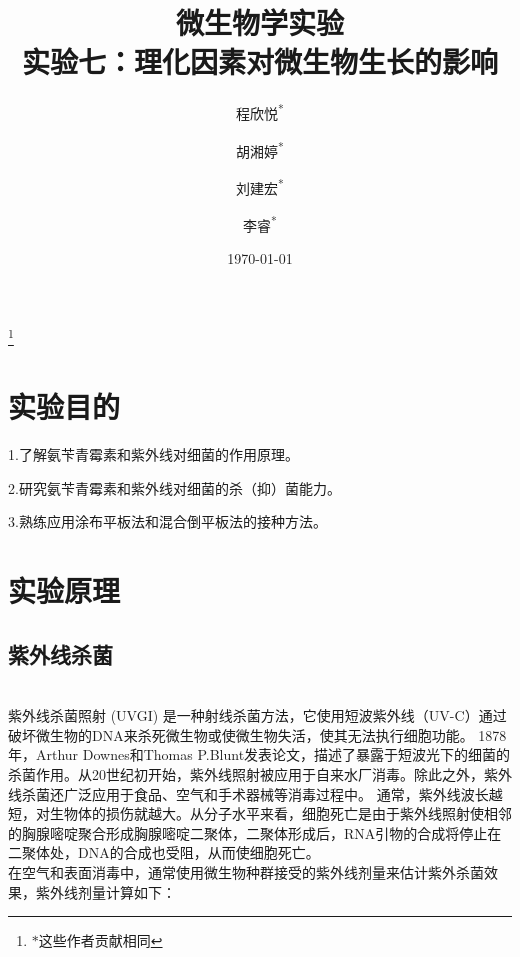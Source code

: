 \documentclass[UTF8]{ctexart}
\begin{document}
    \title{微生物学实验\\实验七：理化因素对微生物生长的影响}
    \author{程欣悦\textsuperscript{*}        \and
            胡湘婷\textsuperscript{*}        \and
            刘建宏\textsuperscript{*}        \and
            李睿\textsuperscript{*}
    }
    
    \date{\today{}}
    \maketitle
    \footnote{$*$这些作者贡献相同}

    \newpage
    
    \tableofcontents
    \newpage

    \section{实验目的}
    
    \begin{flushleft}
    1.了解氨苄青霉素和紫外线对细菌的作用原理。


    2.研究氨苄青霉素和紫外线对细菌的杀（抑）菌能力。


    3.熟练应用涂布平板法和混合倒平板法的接种方法。
    
    \end{flushleft}



    \section{实验原理}
    \subsection{紫外线杀菌}
    \
    \\
    \indent  紫外线杀菌照射 (UVGI) 是一种射线杀菌方法，它使用短波紫外线（UV-C）通过破坏微生物的DNA来杀死微生物或使微生物失活，使其无法执行细胞功能。 1878 年，Arthur Downes和Thomas P.Blunt发表论文，描述了暴露于短波光下的细菌的杀菌作用。从20世纪初开始，紫外线照射被应用于自来水厂消毒。除此之外，紫外线杀菌还广泛应用于食品、空气和手术器械等消毒过程中。
    通常，紫外线波长越短，对生物体的损伤就越大。从分子水平来看，细胞死亡是由于紫外线照射使相邻的胸腺嘧啶聚合形成胸腺嘧啶二聚体，二聚体形成后，RNA引物的合成将停止在二聚体处，DNA的合成也受阻，从而使细胞死亡。
    \\
    \indent  在空气和表面消毒中，通常使用微生物种群接受的紫外线剂量来估计紫外杀菌效果，紫外线剂量计算如下：
\end{document}
